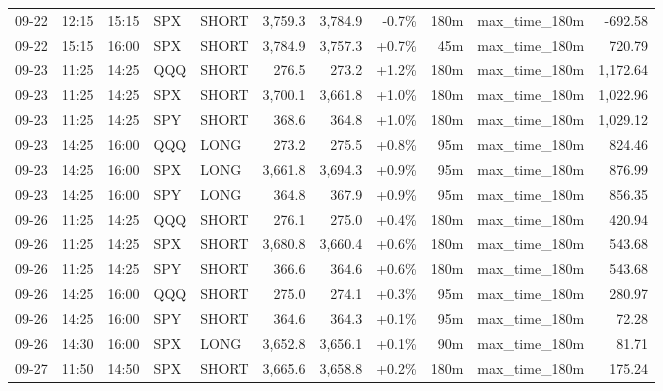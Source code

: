 \documentclass[11pt,a4paper,twoside]{article}
\begin{document}
\begin{center}
\begin{longtable}{>{\color{txtmain}}l l l l l r r r r >{\color{txtmain}}l r}
09-22 & 12:15 & 15:15 & SPX & SHORT & 3,759.3 & 3,784.9 & \textcolor{lossred}{-0.7\%} & 180m & max\_time\_180m & \textcolor{lossred}{-692.58} \\
09-22 & 15:15 & 16:00 & SPX & SHORT & 3,784.9 & 3,757.3 & \textcolor{wingreen}{+0.7\%} & 45m & max\_time\_180m & \textcolor{wingreen}{720.79} \\
09-23 & 11:25 & 14:25 & QQQ & SHORT & 276.5 & 273.2 & \textcolor{wingreen}{+1.2\%} & 180m & max\_time\_180m & \textcolor{wingreen}{1,172.64} \\
09-23 & 11:25 & 14:25 & SPX & SHORT & 3,700.1 & 3,661.8 & \textcolor{wingreen}{+1.0\%} & 180m & max\_time\_180m & \textcolor{wingreen}{1,022.96} \\
09-23 & 11:25 & 14:25 & SPY & SHORT & 368.6 & 364.8 & \textcolor{wingreen}{+1.0\%} & 180m & max\_time\_180m & \textcolor{wingreen}{1,029.12} \\
09-23 & 14:25 & 16:00 & QQQ & LONG & 273.2 & 275.5 & \textcolor{wingreen}{+0.8\%} & 95m & max\_time\_180m & \textcolor{wingreen}{824.46} \\
09-23 & 14:25 & 16:00 & SPX & LONG & 3,661.8 & 3,694.3 & \textcolor{wingreen}{+0.9\%} & 95m & max\_time\_180m & \textcolor{wingreen}{876.99} \\
09-23 & 14:25 & 16:00 & SPY & LONG & 364.8 & 367.9 & \textcolor{wingreen}{+0.9\%} & 95m & max\_time\_180m & \textcolor{wingreen}{856.35} \\
09-26 & 11:25 & 14:25 & QQQ & SHORT & 276.1 & 275.0 & \textcolor{wingreen}{+0.4\%} & 180m & max\_time\_180m & \textcolor{wingreen}{420.94} \\
09-26 & 11:25 & 14:25 & SPX & SHORT & 3,680.8 & 3,660.4 & \textcolor{wingreen}{+0.6\%} & 180m & max\_time\_180m & \textcolor{wingreen}{543.68} \\
09-26 & 11:25 & 14:25 & SPY & SHORT & 366.6 & 364.6 & \textcolor{wingreen}{+0.6\%} & 180m & max\_time\_180m & \textcolor{wingreen}{543.68} \\
09-26 & 14:25 & 16:00 & QQQ & SHORT & 275.0 & 274.1 & \textcolor{wingreen}{+0.3\%} & 95m & max\_time\_180m & \textcolor{wingreen}{280.97} \\
09-26 & 14:25 & 16:00 & SPY & SHORT & 364.6 & 364.3 & \textcolor{wingreen}{+0.1\%} & 95m & max\_time\_180m & \textcolor{wingreen}{72.28} \\
09-26 & 14:30 & 16:00 & SPX & LONG & 3,652.8 & 3,656.1 & \textcolor{wingreen}{+0.1\%} & 90m & max\_time\_180m & \textcolor{wingreen}{81.71} \\
09-27 & 11:50 & 14:50 & SPX & SHORT & 3,665.6 & 3,658.8 & \textcolor{wingreen}{+0.2\%} & 180m & max\_time\_180m & \textcolor{wingreen}{175.24} \\

\end{longtable}
\end{center}
\end{document}
